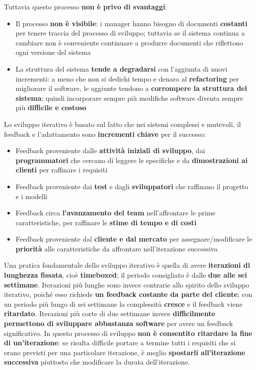 \documentclass[12pt]{article}
\begin{document}
Tuttavia questo processo \textbf{non è privo di svantaggi}:
\begin{itemize}
    \item Il processo \textbf{non è visibile}: i manager hanno bisogno di documenti \textbf{costanti} per tenere traccia del processo di sviluppo; tuttavia se il sistema continua a cambiare non è conveniente continuare a produrre documenti che riflettono ogni versione del sistema
    \item La struttura del sistema \textbf{tende a degradarsi} con l'aggiunta di nuovi incrementi: a meno che non si dedichi tempo e denaro al \textbf{refactoring} per migliorare il software, le aggiunte tendono a \textbf{corrompere la struttura del sistema}; quindi incorporare sempre più modifiche software diventa sempre più \textbf{difficile e costoso}
\end{itemize}
Lo sviluppo iterativo è basato sul fatto che nei sistemi complessi e mutevoli, il feedback e l'adattamento sono \textbf{incrementi chiave} per il successo:
\begin{itemize}
    \item Feedback proveniente dalle \textbf{attività iniziali di sviluppo}, dai \textbf{programmatori} che cercano di leggere le specifiche e da \textbf{dimostrazioni ai clienti} per raffinare i requisiti
    \item Feedback proveniente dai \textbf{test} e dagli \textbf{sviluppatori} che raffinano il progetto e i modelli
    \item Feedback circa \textbf{l'avanzamento del team} nell'affrontare le prime caratteristiche, per raffinare le \textbf{stime di tempo e di costi}
    \item Feedback proveniente dal \textbf{cliente e dal mercato} per assegnare/modificare le \textbf{priorità} alle caratteristiche da affrontare nell'iterazione successiva
\end{itemize}
Una pratica fondamentale dello sviluppo iterativo è quella di avere \textbf{iterazioni di lunghezza fissata}, cioè \textbf{timeboxed}; il periodo consigliato è dalle \textbf{due alle sei settimane}.
Iterazioni più lunghe sono invece contrarie allo spirito dello sviluppo iterativo, poiché esso richiede \textbf{un feedback costante da parte del cliente}; con un periodo più lungo di sei settimane la complessità \textbf{cresce} e il feedback viene \textbf{ritardato}.
Iterazioni più corte di due settimane invece \textbf{difficilmente permettono di sviluppare abbastanza software} per avere un feedback significativo.
In questo processo di sviluppo \textbf{non è consentito ritardare la fine di un'iterazione}: se risulta difficile portare a termine tutti i requisiti che si erano previsti per una particolare iterazione, è meglio \textbf{spostarli all'iterazione successiva} piuttosto che modificare la durata dell'iterazione.
\end{document}
